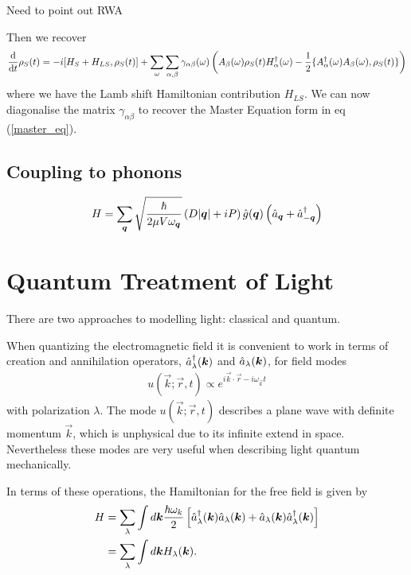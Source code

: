 Need to point out RWA

Then we recover
\begin{align}
  \frac{\mathrm{d}}{\mathrm{d}t} \rho_S(t) = -i[H_S + H_{LS}, \rho_S(t) ] + \sum_\omega \sum_{\alpha, \beta} \gamma_{\alpha\beta}(\omega)\left(A_\beta(\omega)\rho_S(t)H_\alpha^\dagger(\omega) - \frac{1}{2}\{A^\dagger_\alpha(\omega)A_\beta(\omega), \rho_S(t)\} \right)
\end{align}
where we have the Lamb shift Hamiltonian contribution $H_{LS}$. We can now diagonalise the matrix $\gamma_{\alpha\beta}$ to recover the Master Equation form in eq (\ref{master_eq}).

\subsection{Coupling to phonons}

\begin{align}
  H = \sum_{{\boldsymbol{q}}} \sqrt{\frac{\hbar}{2\mu V\omega_{{\boldsymbol{q}}}}} \left(D \vert {\boldsymbol{q}}\vert + iP \right)\hat{g}({\boldsymbol{q}})\left(\hat{a}_{{\boldsymbol{q}}} + \hat{a}^\dagger_{-{\boldsymbol{q}}} \right)
\end{align}



\section{Quantum Treatment of Light}

There are two approaches to modelling light: classical and quantum. 

When quantizing the electromagnetic field it is convenient to work in terms of creation and annihilation operators, $\hat{a}^\dagger_\lambda({\boldsymbol{k}})$ and $\hat{a}_\lambda({\boldsymbol{k}})$, for field modes
\begin{align}
  u(\vec{k}; \vec{r}, t) \propto e^{i\vec{k} \cdot \vec{r} - i\omega_\vec{k} t}
\end{align}
with polarization $\lambda$. The mode $u(\vec{k}; \vec{r}, t)$ describes a plane wave with definite momentum $\vec{k}$, which is unphysical due to its infinite extend in space. Nevertheless these modes are very useful when describing light quantum mechanically.

In terms of these operations, the Hamiltonian for the free field is given by
\begin{align}
  H &= \sum_\lambda \int d{\boldsymbol{k}} \frac{\hbar\omega_k}{2} \left[ \hat{a}^\dagger_\lambda({\boldsymbol{k}})\hat{a}_\lambda({\boldsymbol{k}}) + \hat{a}_\lambda({\boldsymbol{k}})\hat{a}^\dagger_\lambda({\boldsymbol{k}}) \right] \\
  &= \sum_\lambda \int d{\boldsymbol{k}} H_\lambda({\boldsymbol{k}}).
\end{align}

